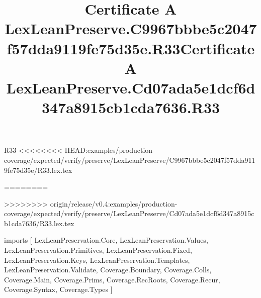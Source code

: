 \begin{lexlean}{R33}
<<<<<<<< HEAD:examples/production-coverage/expected/verify/preserve/LexLeanPreserve/C9967bbbe5c2047f57dda9119fe75d35e/R33.lex.tex
\title{Certificate A LexLeanPreserve.C9967bbbe5c2047f57dda9119fe75d35e.R33}
========
\title{Certificate A LexLeanPreserve.Cd07ada5e1dcf6d347a8915cb1cda7636.R33}
>>>>>>>> origin/release/v0.4:examples/production-coverage/expected/verify/preserve/LexLeanPreserve/Cd07ada5e1dcf6d347a8915cb1cda7636/R33.lex.tex
\begin{coremodule}
imports [
  LexLeanPreservation.Core,
  LexLeanPreservation.Values,
  LexLeanPreservation.Primitives,
  LexLeanPreservation.Fixed,
  LexLeanPreservation.Keys,
  LexLeanPreservation.Templates,
  LexLeanPreservation.Validate,
  Coverage.Boundary,
  Coverage.Colls,
  Coverage.Main,
  Coverage.Prims,
  Coverage.RecRoots,
  Coverage.Recur,
  Coverage.Syntax,
  Coverage.Types
]


\end{coremodule}
\end{lexlean}
